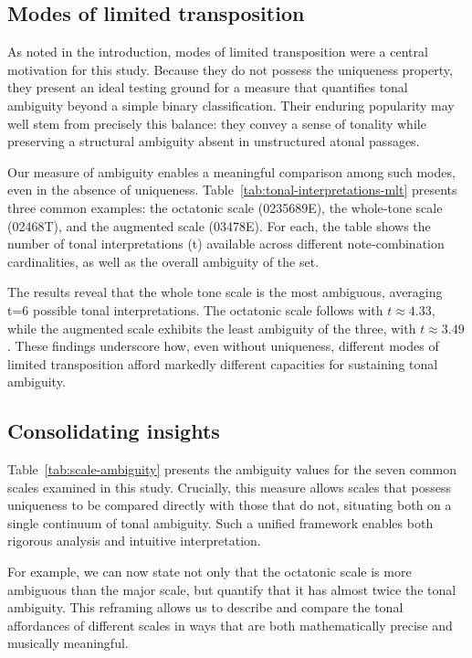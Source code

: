 \documentclass[10pt,twocolumn]{article}
\numberwithin{equation}{section} %
\begin{document}
    

    \subsection{Modes of limited transposition}

    As noted in the introduction, modes of limited transposition were a central motivation for this study.
    Because they do not possess the uniqueness property, they present an ideal testing ground for a measure that quantifies tonal ambiguity beyond a simple binary classification.
    Their enduring popularity may well stem from precisely this balance: they convey a sense of tonality while preserving a structural ambiguity absent in unstructured atonal passages.

    Our measure of ambiguity enables a meaningful comparison among such modes, even in the absence of uniqueness.
    Table~\ref{tab:tonal-interpretations-mlt} presents three common examples: the octatonic scale (0235689E), the whole‑tone scale (02468T), and the augmented scale (03478E).
    For each, the table shows the number of tonal interpretations (t) available across different note‑combination cardinalities, as well as the overall ambiguity of the set.

    The results reveal that the whole tone scale is the most ambiguous, averaging t=6 possible tonal interpretations.
    The octatonic scale follows with $t \approx 4.33$, while the augmented scale exhibits the least ambiguity of the three, with $t \approx 3.49$.
    These findings underscore how, even without uniqueness, different modes of limited transposition afford markedly different capacities for sustaining tonal ambiguity.

    

    \subsection{Consolidating insights}

    Table~\ref{tab:scale-ambiguity} presents the ambiguity values for the seven common scales examined in this study.
    Crucially, this measure allows scales that possess uniqueness to be compared directly with those that do not, situating both on a single continuum of tonal ambiguity.
    Such a unified framework enables both rigorous analysis and intuitive interpretation.

    For example, we can now state not only that the octatonic scale is more ambiguous than the major scale, but quantify that it has almost twice the tonal ambiguity.
    This reframing allows us to describe and compare the tonal affordances of different
    scales in ways that are both mathematically precise and musically meaningful.
\end{document}
